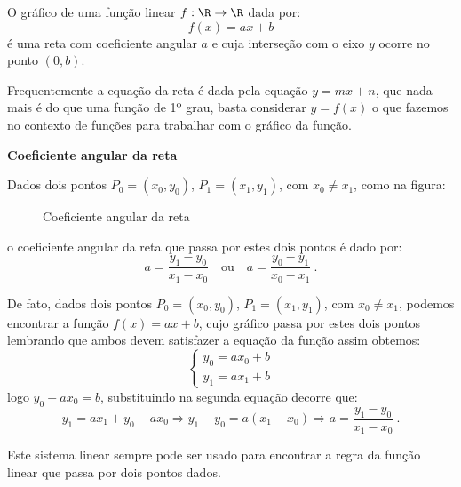    \vskip0.3cm
 \colorbox{azul}{
 \begin{minipage}{0.9\linewidth}
 \begin{center}
 O gráfico de uma função linear $f: \R \to \R$ dada por:
\begin{equation}
f(x) = ax + b
\end{equation}
 é uma reta com coeficiente angular $a$ e cuja interseção com o eixo $y$ ocorre no ponto $(0, b)$.
 \end{center}
 \end{minipage}}
 \vskip0.3cm

 Frequentemente a equação da reta é dada pela equação $y=mx+n$, que nada mais é do que uma função de 1º grau, basta considerar $y=f(x)$ o que fazemos no contexto de funções para trabalhar com o gráfico da função.

\vskip0.3cm
 \textbf{Coeficiente angular da reta}
\vskip0.3cm

  Dados dois pontos $P_0=(x_0, y_0)$, $P_1=(x_1, y_1)$, com $x_0 \neq x_1$, como na figura:

 \begin{figure}[H]
 \centering
    \caption{Coeficiente angular da reta}
  \end{figure}

  o coeficiente angular da reta que passa por estes dois pontos é dado por:
\begin{equation}
a= \frac{y_1 - y_0}{x_1 - x_0} \ \ \ \text{ ou } \ \ \ a= \frac{y_0 - y_1}{x_0 - x_1} \ .
\end{equation}

  De fato, dados dois pontos $P_0=(x_0, y_0)$, $P_1=(x_1, y_1)$, com $x_0 \neq x_1$, podemos encontrar a função $f(x)= ax+b$, cujo gráfico passa por estes dois pontos lembrando que ambos devem satisfazer a equação da função assim obtemos:
  \[ \begin{cases}
   y_0= ax_0 + b \\
   y_1= ax_1 + b
  \end{cases} \]
  logo $y_0 - ax_0= b$, substituindo na segunda equação decorre que:
\begin{equation}
y_1= ax_1 + y_0 - ax_0 \Rightarrow y_1 - y_0= a(x_1 - x_0) \Rightarrow a= \frac{y_1 - y_0}{x_1 - x_0} \ . 
\end{equation}

  Este sistema linear sempre pode ser usado para encontrar a regra da função linear que passa por dois pontos dados.


